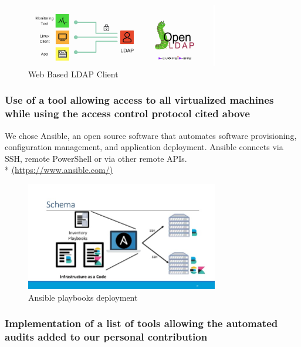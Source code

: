 \begin{figure}[!h]
  \centering
  \includegraphics[width=0.75\textwidth]{images/ldap-example.png}
  \caption{Web Based LDAP Client}
  \label{LDAP}
\end{figure}

\subsubsection{Use of a tool allowing access to all virtualized machines while using the access control protocol cited above}
\vspace{0.5cm}

We chose Ansible, an open source software that automates software
provisioning, configuration management, and application deployment.
Ansible connects via SSH, remote PowerShell or via other remote APIs.\\ *
\url{(https://www.ansible.com/)}

\begin{figure}[!h]
  \centering
  \includegraphics[width=0.75\textwidth]{images/ansible-example.jpg}
  \caption{Ansible playbooks deployment}
  \label{Ansible}
\end{figure}

\pagebreak

\subsubsection{Implementation of a list of tools allowing the automated audits added to our
  personal contribution}




